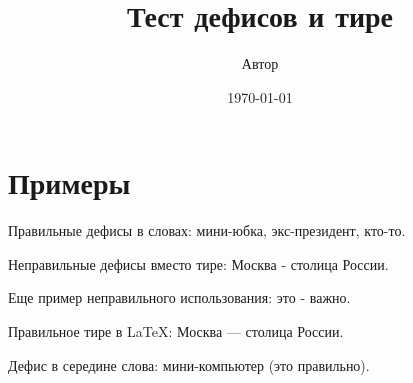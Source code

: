 \documentclass{article}
\begin{document}
\title{Тест дефисов и тире}
\author{Автор}
\date{\today}
\maketitle

\section{Примеры}

Правильные дефисы в словах: мини-юбка, экс-президент, кто-то.

Неправильные дефисы вместо тире: Москва - столица России.

Еще пример неправильного использования: это - важно.

Правильное тире в LaTeX: Москва --- столица России.

Дефис в середине слова: мини-компьютер (это правильно).
\end{document}
